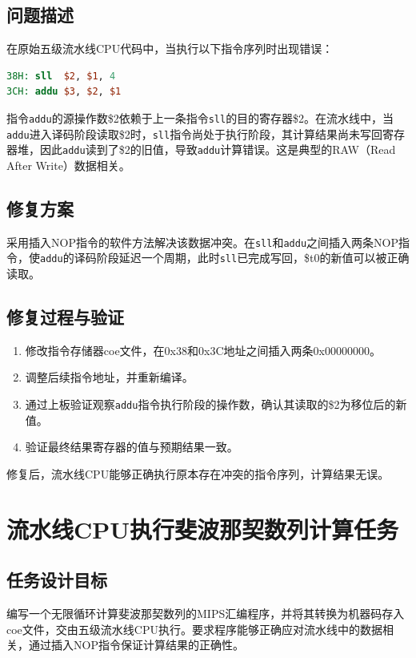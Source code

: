\documentclass[12pt,a4paper]{ctexart}
\begin{document}
\subsection{问题描述}
在原始五级流水线CPU代码中，当执行以下指令序列时出现错误：
\begin{lstlisting}[language=mips, caption={存在数据冲突的指令序列}]
38H: sll  $2, $1, 4    
3CH: addu $3, $2, $1 
\end{lstlisting}
指令\texttt{addu}的源操作数\$2依赖于上一条指令\texttt{sll}的目的寄存器\$2。在流水线中，当\texttt{addu}进入译码阶段读取\$2时，\texttt{sll}指令尚处于执行阶段，其计算结果尚未写回寄存器堆，因此\texttt{addu}读到了\$2的旧值，导致\texttt{addu}计算错误。这是典型的RAW（Read After Write）数据相关。

\subsection{修复方案}
采用插入NOP指令的软件方法解决该数据冲突。在\texttt{sll}和\texttt{addu}之间插入两条NOP指令，使\texttt{addu}的译码阶段延迟一个周期，此时\texttt{sll}已完成写回，\$t0的新值可以被正确读取。

\subsection{修复过程与验证}
\begin{enumerate}
    \item 修改指令存储器coe文件，在0x38和0x3C地址之间插入两条0x00000000。
    \item 调整后续指令地址，并重新编译。
    \item 通过上板验证观察\texttt{addu}指令执行阶段的操作数，确认其读取的\$2为移位后的新值。
    \item 验证最终结果寄存器的值与预期结果一致。
\end{enumerate}
修复后，流水线CPU能够正确执行原本存在冲突的指令序列，计算结果无误。

\section{流水线CPU执行斐波那契数列计算任务}

\subsection{任务设计目标}
编写一个无限循环计算斐波那契数列的MIPS汇编程序，并将其转换为机器码存入coe文件，交由五级流水线CPU执行。要求程序能够正确应对流水线中的数据相关，通过插入NOP指令保证计算结果的正确性。
\end{document}
